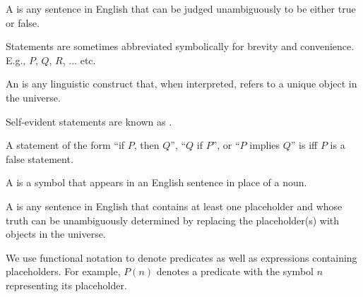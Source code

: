 \begin{dfn}[Statements]
     \label{dfn:metatheory-statement}
    A  is any sentence in English that can be judged unambiguously
    to be either true or false.
\end{dfn}

\begin{rem}
    Statements are sometimes abbreviated symbolically for brevity and convenience. E.g., \( P \), \( Q \), \( R \), \( \dots \) etc.
\end{rem}

\begin{dfn}[Expressions]
     \label{dfn:metatheory-expressions}
    An  is any linguistic construct that, when interpreted, refers to a unique object in the universe.
\end{dfn}

\begin{dfn}[Axioms]
     \label{dfn:metatheory-axioms}
    Self-evident statements are known as .
\end{dfn}

\begin{dfn}
     \label{dfn:metatheory-vacuous-truth}
    A statement of the form ``if \( P \), then \( Q \)'', ``\( Q \) if \( P \)'', or ``\( P \) implies \( Q \)''
    is  iff \( P \) is a false statement.
\end{dfn}

\begin{dfn}[Placeholders]
     \label{dfn:metatheory-placeholders}
    A  is a symbol that appears in an English sentence in place of a noun.
\end{dfn}

\begin{dfn}[Predicates]
     \label{dfn:metatheory-predicate}
    A  is any sentence in English that contains at least one placeholder and whose truth can be unambiguously determined
    by replacing the placeholder(s) with objects in the universe.
\end{dfn}

\begin{notation}
    We use functional notation to denote predicates as well as expressions containing placeholders.
    For example, \( P(n) \) denotes a predicate with the symbol \( n \) representing its placeholder.
\end{notation}

